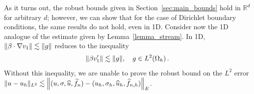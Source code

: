 As it turns out, the robust bounds given in Section~\ref{sec:main_bounds} hold in $\mathbb{R}^d$ for arbitrary $d$; however, we can show that for the case of Dirichlet boundary conditions, the same results do not hold, even in 1D.  
%
Consider now the 1D analogue of the estimate given by Lemma~\ref{lemma_stream}.  In 1D, $\|\beta\cdot\grad v_1\| \lesssim \|g\|$ reduces to the inequality 
\[
\|\beta v_1'\|\lesssim \|g\|, \quad g\in L^2\!\left(\Oh\right).
\]
Without this inequality, we are unable to prove the robust bound on the $L^2$ error $\|u-u_h\|_{L^2} \lesssim \nor{(u,\sigma,\widehat{u},\widehat{f}_n)-(u_h,\sigma_h,\widehat{u}_h,\widehat{f}_{n,h})}_E$.

